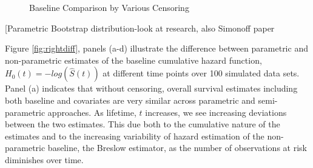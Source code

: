\documentclass[12pt,letterpaper]{article}
\begin{document}
\begin{figure}[h!]
	\caption{Baseline Comparison by Various Censoring}
	\label{fig:rightbase}
\end{figure}


[Parametric Bootstrap distribution-look at research, also Simonoff paper

Figure \ref{fig:rightdiff}, panels (a-d) illustrate the difference between parametric and non-parametric estimates of the baseline cumulative hazard function, $H_0(t) = -log(\hat{S}(t))$ at different time points over 100 simulated data sets.  Panel (a) indicates that without censoring, overall survival estimates including both baseline and covariates are very similar across parametric and semi-parametric approaches.  As lifetime, $t$ increases, we see increasing deviations between the two estimates.  This due both to the cumulative nature of the estimates and to the increasing variability of hazard estimation of the non-parametric baseline, the Breslow estimator,   \citep{DavHink1997,Burr1994} as the number of observations at risk diminishes over time.
\end{document}
